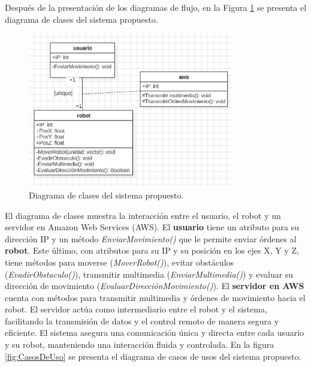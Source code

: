         \vskip 0.5cm
        \clearpage
        Despu\'es de la presentaci\'on de los diagramas de flujo, en la Figura \ref{fig:Clases} se presenta el diagrama de clases del sistema propuesto.
        \vskip 0.5cm
            \begin{figure}[htbp]
                \centering
                \includegraphics[width=0.8\textwidth]{images/desarrollo/diagramas/Clases.jpeg}
                \caption{Diagrama de clases del sistema propuesto.}
                \label{fig:Clases}
            \end{figure}
        \vskip 0.5cm
        El diagrama de clases muestra la interacci\'on entre el usuario, el robot y un servidor en Amazon Web Services (AWS). 
        El \textbf{usuario} tiene un atributo para su direcci\'on IP y un m\'etodo \textit{EnviarMovimiento()} 
        que le permite enviar \'ordenes al \textbf{robot}. Este \'ultimo, con atributos para su IP y su posici\'on en los ejes X, Y 
        y Z, tiene m\'etodos para moverse (\textit{MoverRobot()}), evitar obst\'aculos (\textit{EvadirObstaculo()}), 
        transmitir multimedia (\textit{EnviarMultimedia()}) y evaluar su direcci\'on de movimiento (\textit{EvaluarDirecci\'onMovimiento()}).
        \vskip 0.5cm
        El \textbf{servidor en AWS} cuenta con m\'etodos para transmitir multimedia y \'ordenes de movimiento hacia el robot. 
        El servidor act\'ua como intermediario entre el robot y el sistema, facilitando la transmisi\'on de datos y el control 
        remoto de manera segura y eficiente. El sistema asegura una comunicaci\'on \'unica y directa entre cada usuario y su robot, 
        manteniendo una interacci\'on fluida y controlada.
        \vskip 0.5cm
        En la figura \ref{fig:CasosDeUso} se presenta el diagrama de casos de usos del sistema propuesto.
